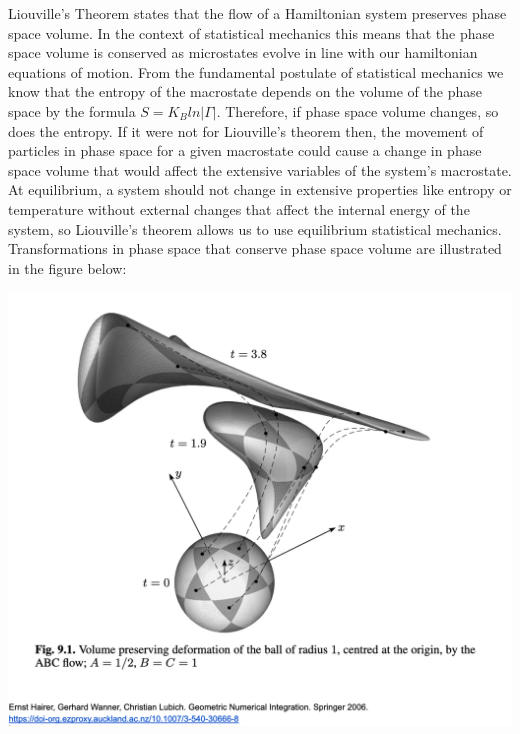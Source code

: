 \documentclass{article}
\begin{document}
Liouville’s Theorem states that the flow of a Hamiltonian system preserves phase space volume. In the context of statistical mechanics this means that the phase space volume is conserved as microstates evolve in line with our hamiltonian equations of motion. From the fundamental postulate of statistical mechanics we know that the entropy of the macrostate depends on the volume of the phase space by the formula $S = K_{B} ln |\Gamma| $. Therefore, if phase space volume changes, so does the entropy. If it were not for Liouville’s theorem then, the movement of particles in phase space for a given macrostate could cause a change in phase space volume that would affect the extensive variables of the system’s macrostate. At equilibrium, a system should not change in extensive properties like entropy or temperature without external changes that affect the internal energy of the system, so Liouville’s theorem allows us to use equilibrium statistical mechanics. Transformations in phase space that conserve phase space volume are illustrated in the figure below:

\begin{centering}

\includegraphics[scale=0.4]{aferLiouvillefigure.png}

\end{centering}
\end{document}
